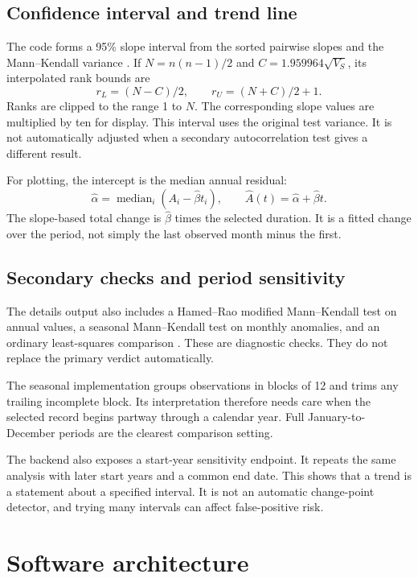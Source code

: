 \documentclass[10pt,a4paper,twocolumn]{article}
\begin{document}
\subsection{Confidence interval and trend line}
The code forms a 95\% slope interval from the sorted pairwise slopes and the Mann--Kendall variance \cite{gilbert,usgs}. If $N=n(n-1)/2$ and $C=1.959964\sqrt{V_S}$, its interpolated rank bounds are
\begin{equation}
r_L=(N-C)/2,\qquad r_U=(N+C)/2+1.
\end{equation}
Ranks are clipped to the range 1 to $N$. The corresponding slope values are multiplied by ten for display. This interval uses the original test variance. It is not automatically adjusted when a secondary autocorrelation test gives a different result.

For plotting, the intercept is the median annual residual:
\begin{equation}
\hat\alpha=\operatorname{median}_i(A_i-\hat\beta t_i),
\qquad \hat A(t)=\hat\alpha+\hat\beta t.
\end{equation}
The slope-based total change is $\hat\beta$ times the selected duration. It is a fitted change over the period, not simply the last observed month minus the first.

\subsection{Secondary checks and period sensitivity}
The details output also includes a Hamed--Rao modified Mann--Kendall test on annual values, a seasonal Mann--Kendall test on monthly anomalies, and an ordinary least-squares comparison \cite{hamed,hirsch,pymk}. These are diagnostic checks. They do not replace the primary verdict automatically.

The seasonal implementation groups observations in blocks of 12 and trims any trailing incomplete block. Its interpretation therefore needs care when the selected record begins partway through a calendar year. Full January-to-December periods are the clearest comparison setting.

The backend also exposes a start-year sensitivity endpoint. It repeats the same analysis with later start years and a common end date. This shows that a trend is a statement about a specified interval. It is not an automatic change-point detector, and trying many intervals can affect false-positive risk.

\section{Software architecture}
\end{document}

